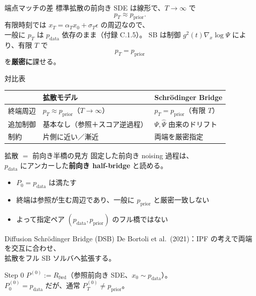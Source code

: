 \asmain
\begin{frame}{端点マッチの差}
    標準拡散の前向き SDE は線形で、$T\to\infty$ で
    \[
        p_T\approx p_{\mathrm{prior}}.
    \]
    有限時刻では $x_T=\alpha_T x_0+\sigma_T\epsilon$ の周辺なので、\\
    一般に $p_T$ は $p_{\mathrm{data}}$ 依存のまま（付録 C.1.5）。
    \vfill
    SB は制御 $g^{2}(t)\nabla_x\log\Psi$ により、有限 $T$ で
    \[
        p_T=p_{\mathrm{prior}}
    \]
    を\textbf{厳密に}課せる。
\end{frame}
\asmain
\begin{frame}{対比表}
    \renewcommand{\arraystretch}{1.35}
    \begin{tabular}{lll}
        & \textbf{拡散モデル} & \textbf{Schrödinger Bridge} \\
        \hline
        終端周辺
        & $p_T\approx p_{\mathrm{prior}}$（$T\to\infty$）
        & $p_T=p_{\mathrm{prior}}$（有限 $T$）
        \\
        追加制御
        & 基本なし（参照＋スコア逆過程）
        & $\Psi,\widehat\Psi$ 由来のドリフト
        \\
        制約
        & 片側に近い／漸近
        & 両端を厳密指定
        \\
    \end{tabular}
\end{frame}
\asmain
\begin{frame}{拡散 $=$ 前向き半橋の見方}
    固定した前向き noising 過程は、\\
    $p_{\mathrm{data}}$ にアンカーした\textbf{前向き half-bridge} と読める。
    \begin{itemize}
        \item $P_0=p_{\mathrm{data}}$ は満たす
        \item 終端は参照が生む周辺であり、一般に $p_{\mathrm{prior}}$ と厳密一致しない
        \item よって指定ペア $(p_{\mathrm{data}},p_{\mathrm{prior}})$ のフル橋ではない
    \end{itemize}
\end{frame}
\asmain
\begin{frame}{Diffusion Schrödinger Bridge (DSB)}
    De Bortoli et al.\ (2021)：IPF の考えで両端を交互に合わせ、\\
    拡散をフル SB ソルバへ拡張する。
    \begin{block}{Step 0}
        $P^{(0)}:=R_{\mathrm{fwd}}$（参照前向き SDE、$x_0\sim p_{\mathrm{data}}$）。\\
        $P_0^{(0)}=p_{\mathrm{data}}$ だが、通常 $P_T^{(0)}\neq p_{\mathrm{prior}}$。
    \end{block}
\end{frame}
